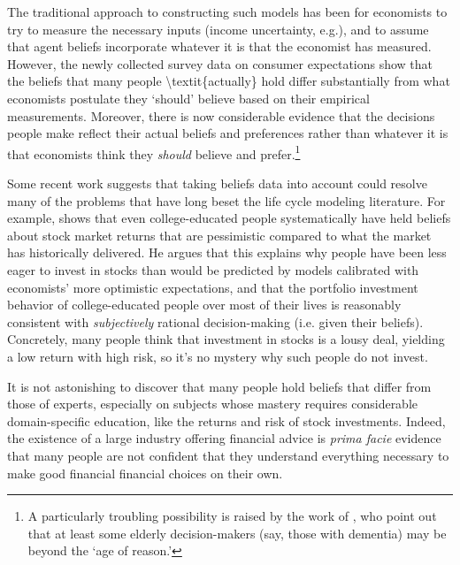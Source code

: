 \documentclass{article}
\begin{document}
The traditional approach to constructing such models has been for economists to try to measure the necessary inputs (income uncertainty, e.g.), and to assume that agent beliefs incorporate whatever it is that the economist has measured.
However, the newly collected survey data on consumer expectations show that the beliefs that many people {\textbackslash}textit\{actually\} hold differ substantially from what economists postulate they `should' believe based on their empirical measurements.
Moreover, there is now considerable evidence that the decisions people make reflect their actual beliefs and preferences rather than whatever it is that economists think they \textit{should} believe and prefer.\footnote{A particularly troubling possibility is raised by the work of \cite{gabaix2010age}, who point out that at least some elderly decision-makers (say, those with dementia) may be beyond the `age of reason.'}


Some recent work suggests that taking beliefs data into account could resolve many of the problems that have long beset the life cycle modeling literature.
For example, \cite{velasquezgiraldoJMP} shows that even college-educated people systematically have held beliefs about stock market returns that are pessimistic compared to what the market has historically delivered.
He argues that this explains why people have been less eager to invest in stocks than would be predicted by models calibrated with economists' more optimistic expectations, and that the portfolio investment behavior of college-educated people over most of their lives is reasonably consistent with \textit{subjectively} rational decision-making (i.e. given their beliefs).
Concretely, many people think that investment in stocks is a lousy deal, yielding a low return with high risk, so it's no mystery why such people do not invest.

It is not astonishing to discover that many people hold beliefs that differ from those of experts, especially on subjects whose mastery requires considerable domain-specific education, like the returns and risk of stock investments.
Indeed, the existence of a large industry offering financial advice is \textit{prima facie} evidence that many people are not confident that they understand everything necessary to make good financial financial choices on their own.
\end{document}
